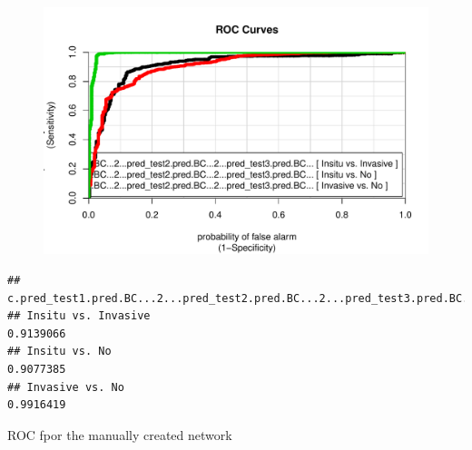 \documentclass[]{article}
\begin{document}
\begin{figure}[htbp]
\centering
\includegraphics{BN_Ass2_files/figure-latex/unnamed-chunk-13-1.pdf}
\end{figure}

\begin{verbatim}
##                     c.pred_test1.pred.BC...2...pred_test2.pred.BC...2...pred_test3.pred.BC...
## Insitu vs. Invasive                                                                 0.9139066
## Insitu vs. No                                                                       0.9077385
## Invasive vs. No                                                                     0.9916419
\end{verbatim}

ROC fpor the manually created network
\end{document}
